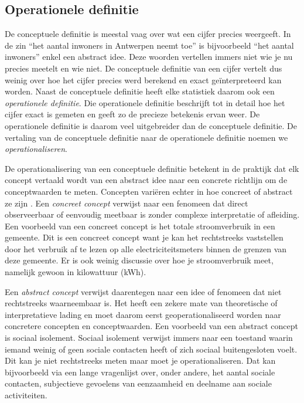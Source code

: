 \documentclass[\mainfiledir/00_handleiding_statistiekproductie.tex]{subfiles}
\begin{document}
	

	

	
	
	
	
	
\subsection{Operationele definitie}
	
De conceptuele definitie is meestal vaag over wat een cijfer precies weergeeft. In de zin ``het aantal inwoners in Antwerpen neemt toe'' is bijvoorbeeld ``het aantal inwoners'' enkel een abstract idee. Deze woorden vertellen immers niet wie je nu precies meetelt en wie niet. De conceptuele definitie van een cijfer vertelt dus weinig over hoe het cijfer precies werd berekend en exact geïnterpreteerd kan worden. Naast de conceptuele definitie heeft elke statistiek daarom ook een \emph{operationele definitie}. Die operationele definitie beschrijft tot in detail hoe het cijfer exact is gemeten en geeft zo de precieze betekenis ervan weer. De operationele definitie is daarom veel uitgebreider dan de conceptuele definitie. De vertaling van de conceptuele definitie naar de operationele definitie noemen we \emph{operationaliseren}.

De operationalisering van een conceptuele definitie betekent in de praktijk dat elk concept vertaald wordt van een abstract idee naar een concrete richtlijn om de conceptwaarden te meten. Concepten variëren echter in hoe concreet of abstract ze zijn \parencite{neuman2014Social}. Een \emph{concreet concept} verwijst naar een fenomeen dat direct observeerbaar of eenvoudig meetbaar is zonder complexe interpretatie of afleiding. Een voorbeeld van een concreet concept is het totale stroomverbruik in een gemeente. Dit is een concreet concept want je kan het rechtstreeks vaststellen door het verbruik af te lezen op alle electriciteitsmeters binnen de grenzen van deze gemeente. Er is ook weinig discussie over hoe je stroomverbruik meet, namelijk gewoon in kilowattuur (kWh). 

Een \emph{abstract concept} verwijst daarentegen naar een idee of fenomeen dat niet rechtstreeks waarneembaar is. Het heeft een zekere mate van theoretische of interpretatieve lading en moet daarom eerst geoperationaliseerd worden naar concretere concepten en conceptwaarden. Een voorbeeld van een abstract concept is sociaal isolement. Sociaal isolement verwijst immers naar een toestand waarin iemand weinig of geen sociale contacten heeft of zich sociaal buitengesloten voelt. Dit kan je niet rechtstreeks meten maar moet je operationaliseren. Dat kan bijvoorbeeld via een lange vragenlijst over, onder andere, het aantal sociale contacten, subjectieve gevoelens van eenzaamheid en deelname aan sociale activiteiten.
	
\end{document}
